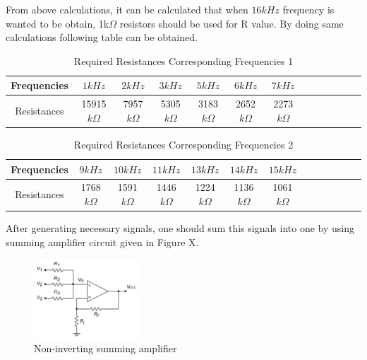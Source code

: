 \documentclass[letterpaper,12pt]{article}
\begin{document}
From above calculations, it can be calculated that when \(16kHz\) frequency is wanted to be obtain, 1k\(\Omega \) resistors should be used for R value. By doing same calculations following table can be obtained.
\begin{table}[H]
    \begin{center}
        \caption{Required Resistances Corresponding Frequencies 1}
        \vspace{2mm}
        \begin{tabular}{||c | c | c | c| c| c| c| c| c| c| c| c| c||} 
            \hline
            Frequencies &\(1kHz\) & \(2kHz\) & \(3kHz\)& \(5kHz\)& \(6kHz\)& \(7kHz\)\\ [0.5ex] 
            \hline\hline
            Resistances &15915\(k\Omega\) & 7957\(k\Omega\) & 5305\(k\Omega\)& 3183\(k\Omega\)& 2652\(k\Omega\)& 2273\(k\Omega\)\\
            \hline
        \end{tabular}
    \end{center}
\end{table}  
\begin{table}[H]
    \begin{center}
        \caption{Required Resistances Corresponding Frequencies 2}
        \vspace{2mm}
        \begin{tabular}{||c | c | c | c| c| c| c| c| c| c| c| c| c||} 
            \hline
            Frequencies &\(9kHz\)& \(10kHz\)& \(11kHz\)& \(13kHz\)& \(14kHz\)& \(15kHz\)\\ [0.5ex] 
            \hline\hline
            Resistances &1768\(k\Omega\)& 1591\(k\Omega\)& 1446\(k\Omega\)& 1224\(k\Omega\)& 1136\(k\Omega\)& 1061\(k\Omega\)\\
            \hline
        \end{tabular}
    \end{center}
\end{table}  

After generating necessary signals, one should sum this signals into one by using summing amplifier circuit given in Figure X. 
\begin{figure}[h]
    \centering
    \includegraphics[width = 0.35\textwidth]{Non-Inv-Sum-Amp.jpg}
    \caption{Non-inverting summing amplifier}
\end{figure} 
\end{document}
